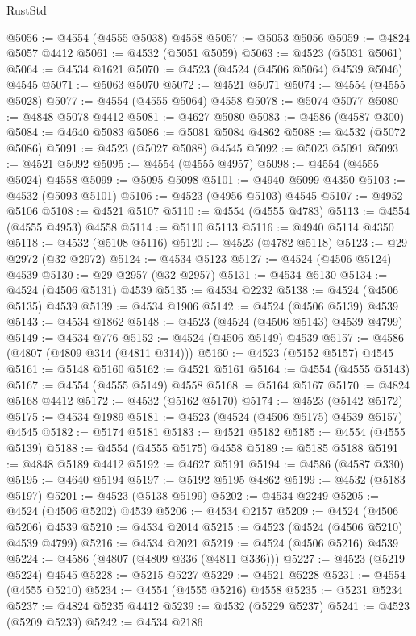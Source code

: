 \begin{lexlean}{RustStd}
\begin{coremodule}
@5056 := @4554 (@4555 @5038) @4558
@5057 := @5053 @5056
@5059 := @4824 @5057 @4412
@5061 := @4532 (@5051 @5059)
@5063 := @4523 (@5031 @5061)
@5064 := @4534 @1621
@5070 := @4523 (@4524 (@4506 @5064) @4539 @5046) @4545
@5071 := @5063 @5070
@5072 := @4521 @5071
@5074 := @4554 (@4555 @5028)
@5077 := @4554 (@4555 @5064) @4558
@5078 := @5074 @5077
@5080 := @4848 @5078 @4412
@5081 := @4627 @5080
@5083 := @4586 (@4587 @300)
@5084 := @4640 @5083
@5086 := @5081 @5084 @4862
@5088 := @4532 (@5072 @5086)
@5091 := @4523 (@5027 @5088) @4545
@5092 := @5023 @5091
@5093 := @4521 @5092
@5095 := @4554 (@4555 @4957)
@5098 := @4554 (@4555 @5024) @4558
@5099 := @5095 @5098
@5101 := @4940 @5099 @4350
@5103 := @4532 (@5093 @5101)
@5106 := @4523 (@4956 @5103) @4545
@5107 := @4952 @5106
@5108 := @4521 @5107
@5110 := @4554 (@4555 @4783)
@5113 := @4554 (@4555 @4953) @4558
@5114 := @5110 @5113
@5116 := @4940 @5114 @4350
@5118 := @4532 (@5108 @5116)
@5120 := @4523 (@4782 @5118)
@5123 := @29 @2972 (@32 @2972)
@5124 := @4534 @5123
@5127 := @4524 (@4506 @5124) @4539
@5130 := @29 @2957 (@32 @2957)
@5131 := @4534 @5130
@5134 := @4524 (@4506 @5131) @4539
@5135 := @4534 @2232
@5138 := @4524 (@4506 @5135) @4539
@5139 := @4534 @1906
@5142 := @4524 (@4506 @5139) @4539
@5143 := @4534 @1862
@5148 := @4523 (@4524 (@4506 @5143) @4539 @4799)
@5149 := @4534 @776
@5152 := @4524 (@4506 @5149) @4539
@5157 := @4586 (@4807 (@4809 @314 (@4811 @314)))
@5160 := @4523 (@5152 @5157) @4545
@5161 := @5148 @5160
@5162 := @4521 @5161
@5164 := @4554 (@4555 @5143)
@5167 := @4554 (@4555 @5149) @4558
@5168 := @5164 @5167
@5170 := @4824 @5168 @4412
@5172 := @4532 (@5162 @5170)
@5174 := @4523 (@5142 @5172)
@5175 := @4534 @1989
@5181 := @4523 (@4524 (@4506 @5175) @4539 @5157) @4545
@5182 := @5174 @5181
@5183 := @4521 @5182
@5185 := @4554 (@4555 @5139)
@5188 := @4554 (@4555 @5175) @4558
@5189 := @5185 @5188
@5191 := @4848 @5189 @4412
@5192 := @4627 @5191
@5194 := @4586 (@4587 @330)
@5195 := @4640 @5194
@5197 := @5192 @5195 @4862
@5199 := @4532 (@5183 @5197)
@5201 := @4523 (@5138 @5199)
@5202 := @4534 @2249
@5205 := @4524 (@4506 @5202) @4539
@5206 := @4534 @2157
@5209 := @4524 (@4506 @5206) @4539
@5210 := @4534 @2014
@5215 := @4523 (@4524 (@4506 @5210) @4539 @4799)
@5216 := @4534 @2021
@5219 := @4524 (@4506 @5216) @4539
@5224 := @4586 (@4807 (@4809 @336 (@4811 @336)))
@5227 := @4523 (@5219 @5224) @4545
@5228 := @5215 @5227
@5229 := @4521 @5228
@5231 := @4554 (@4555 @5210)
@5234 := @4554 (@4555 @5216) @4558
@5235 := @5231 @5234
@5237 := @4824 @5235 @4412
@5239 := @4532 (@5229 @5237)
@5241 := @4523 (@5209 @5239)
@5242 := @4534 @2186

\end{coremodule}
\end{lexlean}
